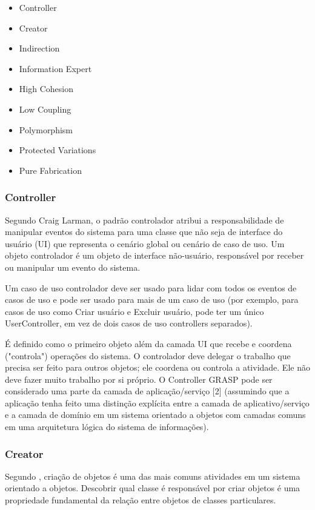\documentclass[12pt]{article}
\begin{document}
\begin{itemize}
	\item Controller	
	\item Creator
	\item Indirection
	\item Information Expert
	\item High Cohesion
	\item Low Coupling
	\item Polymorphism
	\item Protected Variations
	\item Pure Fabrication
\end{itemize}


\subsubsection{Controller} \label{sec:grasp}
	
Segundo \cite{CRAIG_LARMAN} Craig Larman, o padrão controlador atribui a responsabilidade de manipular eventos do sistema para uma classe que não seja de interface do usuário (UI) que representa o cenário global ou cenário de caso de uso. Um objeto controlador é um objeto de interface não-usuário, responsável por receber ou manipular um evento do sistema.

Um caso de uso controlador deve ser usado para lidar com todos os eventos de casos de uso e pode ser usado para mais de um caso de uso (por exemplo, para casos de uso como Criar usuário e Excluir usuário, pode ter um único UserController, em vez de dois casos de uso controllers separados).

É definido como o primeiro objeto além da camada UI que recebe e coordena ("controla") operações do sistema. O controlador deve delegar o trabalho que precisa ser feito para outros objetos; ele coordena ou controla a atividade. Ele não deve fazer muito trabalho por si próprio. O Controller GRASP pode ser considerado uma parte da camada de aplicação/serviço [2] (assumindo que a aplicação tenha feito uma distinção explícita entre a camada de aplicativo/serviço e a camada de domínio em um sistema orientado a objetos com camadas comuns em uma arquitetura lógica do sistema de informações).

\subsubsection{Creator}

Segundo \cite{CRAIG_LARMAN}, criação de objetos é uma das mais comuns atividades em um sistema orientado a objetos. Descobrir qual classe é responsável por criar objetos é uma propriedade fundamental da relação entre objetos de classes particulares.
\end{document}
